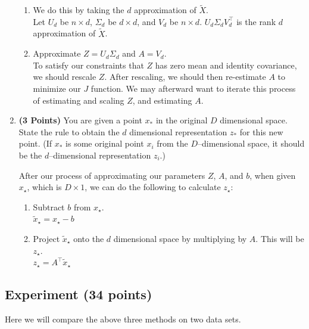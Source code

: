 \documentclass[a4paper]{article}
\theoremstyle{definition}
\newenvironment{soln}{
	\leavevmode\color{blue}\ignorespaces
}{}
\begin{document}
\begin{enumerate}
\begin{soln}
\begin{enumerate}
		\item We do this by taking the $d$ approximation of $\tilde{X}$. \\
		Let $U_d$ be $n \times d$, $\Sigma_d$ be $d \times d$, and $V_d$ be $n \times d$.
		$U_d \Sigma_d V_d^\top$ is the rank $d$ approximation of $\tilde{X}$.
		\item Approximate $Z = U_d \Sigma_d$ and $A=V_d$. \\
		To satisfy our constraints that $Z$ has zero mean and identity covariance, we should rescale $Z$. After rescaling, we should then re-estimate $A$ to minimize our $J$ function. We may afterward want to iterate this process of estimating and scaling $Z$, and estimating $A$.
	\end{enumerate}
\end{soln}

\item \textbf{(3 Points)}
You are given a point $x_*$ in the original $D$ dimensional space.
State the rule to obtain the $d$ dimensional
representation $z_*$ for this new point.
(If $x_*$ is some original point $x_i$ from the $D$--dimensional space, it should be the
$d$--dimensional representation $z_i$.)

\begin{soln}
	After our process of approximating our parameters $Z$, $A$, and $b$, when given $x_\star$, which is $D \times 1$, we can do the following to calculate $z_\star$:
	\begin{enumerate}
		\item Subtract $b$ from $x_\star$. \\
		$\tilde{x}_\star = x_\star - b$
		\item Project $\tilde{x}_\star$ onto the $d$ dimensional space by multiplying by $A$. This will be $z_\star$. \\
		$z_\star = A^\top \tilde{x}_\star$
	\end{enumerate}
\end{soln}


\end{enumerate}


\subsection{Experiment (34 points)}

Here we will compare the above three methods on two data sets. 
\end{document}

